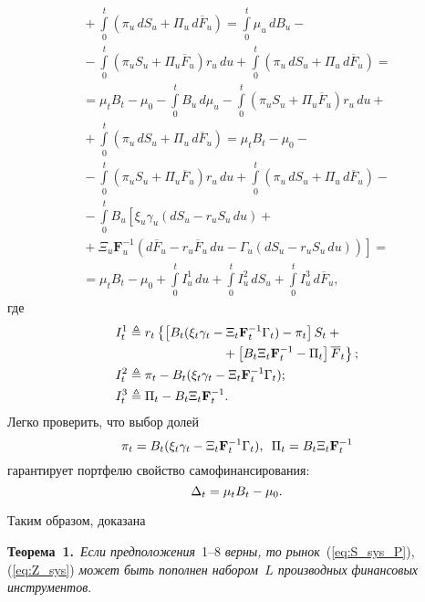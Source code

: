 \begin{multicols}{2}
\noindent
\begin{multline*}
{}+
  \int\limits_0^t \left( \pi_u\, dS_u + \Pi_u\, d \overline{F}_u \right) =
\int\limits_0^t  \mu_u \,dB_u -{}\\
{}- \! \int\limits_0^t \left( \pi_uS_u+\Pi_u\overline{F}_u \right) r_u \,du +
\!\int\limits_0^t \left( \pi_u\, dS_u + \Pi_u \,d\overline{F}_u \right) = {} \\
{} =
\mu_t B_t -\mu_0 - \int\limits_0^t  B_u\, d\mu_u -
\int\limits_0^t \left( \pi_uS_u+\Pi_u\overline{F}_u \right) r_u \,du +{}\\
{}+ 
\int\limits_0^t \left( \pi_u \,dS_u + \Pi_u\, d\overline{F}_u \right)  = 
\mu_t B_t -\mu_0 -{}\\
{}- 
\!\int\limits_0^t \left( \pi_uS_u+\Pi_u\overline{F}_u \right) r_u\, du +
\!\int\limits_0^t \left( \pi_u \,dS_u + \Pi_u \,d\overline{F}_u \right) - {} \\
{} - \int\limits_0^t B_u \left[ \xi_u \gamma_u (dS_u-r_u S_u \,du) + {}\right.\\
\left.{}+ \Xi_u \mathbf{F}^{-1}_u \left(
d\overline{F}_u \!-\!r_u\overline{F}_u\,du \!-\! \Gamma_u(dS_u-r_u S_u \,du) \right) \right] ={} \\
{} =
\mu_t B_t -\mu_0 +
\int\limits_0^t I_u^1 \,du + \int\limits_0^t I_u^2 \,dS_u +
\int\limits_0^t I_u^3 \,d\overline{F}_u,
\end{multline*}
где
\begin{align*}
I_t^1 &\triangleq r_t \left\{ \left[
B_t(\xi_t\gamma_t -\Xi_t\mathbf{F}^{-1}_t \Gamma_t) -\pi_t
\right]S_t + {}\right.\\
&\hspace*{25mm}\left.{}+\left[ B_t \Xi_t\mathbf{F}^{-1}_t - \Pi_t
\right] \overline{F}_t
\right\};
\\
I_t^2 &\triangleq
\pi_t - B_t(\xi_t\gamma_t -\Xi_t\mathbf{F}^{-1}_t \Gamma_t);
\\
I_t^3 &\triangleq \Pi_t - B_t \Xi_t\mathbf{F}^{-1}_t.
\end{align*}
Легко проверить, что выбор долей
$$
\pi_t = B_t(\xi_t\gamma_t -\Xi_t\mathbf{F}^{-1}_t \Gamma_t),
\enskip
\Pi_t = B_t \Xi_t\mathbf{F}^{-1}_t
$$
гарантирует портфелю свойство самофинансирования:
$$
\Delta_t \hm= \mu_t B_t \hm- \mu_0.
$$

Таким образом, доказана


\smallskip

\noindent
\textbf{Теорема~1.}\ 
\textit{Если предположения}~1--8 \textit{верны, то рынок}~(\ref{eq:S_sys_P}), (\ref{eq:Z_sys}) 
\textit{может быть пополнен набором~$L$ производных финансовых инструментов}.


\end{multicols}
